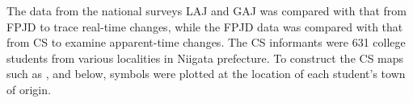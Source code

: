 \documentclass[output=paper]{LSP/langsci}
\begin{document}
\begin{table}
\caption{A comparison of characteristics of four surveys}\label{tab:1}
\end{table}

The data from the national surveys \textsc{LAJ} and \textsc{GAJ} was compared with that from \textsc{FPJD} to trace real-time changes, while the \textsc{FPJD} data was compared with that from \textsc{CS} to examine apparent-time changes.  The \textsc{CS} informants were 631 college students from various localities in Niigata prefecture. To construct the \textsc{CS} maps such as ,  and  below, symbols were plotted at the location of each student's town of origin.
\end{document}
